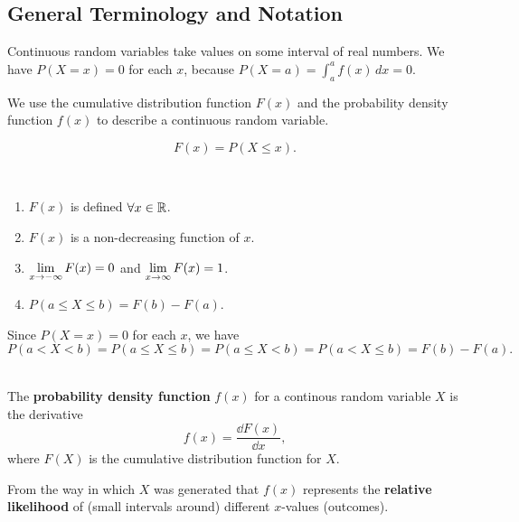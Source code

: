 \subsection{General Terminology and Notation}

Continuous random variables take values on some interval of real numbers. We have $P(X = x) = 0$ for each $x$, because $P(X = a) = \displaystyle \int_{a}^{a} f(x) \, dx = 0$. 

We use the cumulative distribution function $F(x)$ and the probability density function $f(x)$ to describe a continuous random variable.

\begin{definition}
    \phantom{}
    \[F(x) = P(X \leq x).\]
\end{definition}

\begin{theorem}
    \phantom{}\
    \begin{enumerate}
        \item $F(x)$ is defined $\forall x \in {\mathbb{R}}$.
        \item $F(x)$ is a non-decreasing function of $x$.
        \item $\displaystyle \lim_{x \to -\infty} F(x) = 0$ and $\displaystyle \lim_{x \to \infty} F(x) = 1$.
        \item  $P(a \leq X \leq b) = F(b) - F(a)$.
    \end{enumerate}
\end{theorem}

\begin{note}
    Since $P(X = x) = 0$ for each $x$, we have \vspace{-3mm}
    \[P(a < X < b) = P(a \leq X \leq b) = P(a \leq X < b) = P(a < X \leq b) = F(b) - F(a).\]
\end{note}

\begin{definition}
    \phantom{}\\
    The \textbf{probability density function} $f(x)$ for a continous random variable $X$
    is the derivative \[f(x) = \frac{\dd{F(x)}}{\dd{x}},\]
    where $F(X)$ is the cumulative distribution function for $X$.
\end{definition}

\begin{note}
    From the way in which $X$ was generated that $f(x)$ represents the \textbf{relative likelihood} of (small intervals around) different $x$-values (outcomes).
\end{note}

